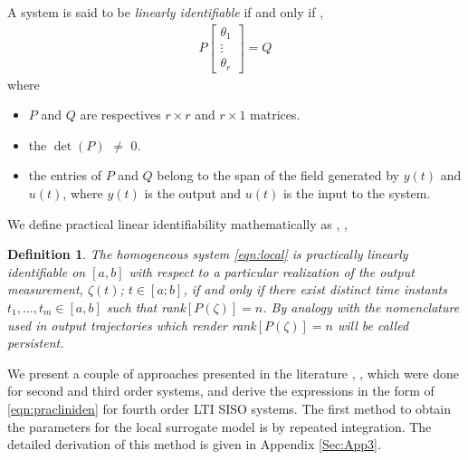 \documentclass[letterpaper%
, twoside%
, 12pt%
,memoire%
, english%
,creativecommons,hyperref%
]{thETS}
\theoremstyle{newThmStyle}
\newtheorem{definitionNewStyle}{Definition}
\begin{document}
\par A system is said to be \textit{linearly identifiable} if and only if \citep{fliess2003algebraic}, 
\begin{equation}\label{eqn:pracliniden}
\begin{split}
P\begin{bmatrix} \theta_1 \\ \vdots \\ \theta_r \end{bmatrix} = Q
\end{split}
\end{equation}
where
\begin{itemize}
\item $P$ and $Q$ are respectives $r \times r$ and $r \times 1$ matrices.
\item the $\det(P)$ $\neq$ $0$. 
\item the entries of $P$ and $Q$ belong to the span of the field generated by $y(t)$ and $u(t)$, where $y(t)$ is the output and $u(t)$ is the input to the system.
\end{itemize}
We define practical linear identifiability mathematically as \citep{pandey2018variational}, \citep{fliess2003algebraic}, 
\begin{definitionNewStyle}
The homogeneous system \eqref{eqn:local} is practically linearly identifiable on $[a, b]$ with respect to a particular realization of the output measurement, $\zeta(t)$; $t \in [a; b]$, if and only if there exist distinct time instants $t_1,..., t_m \in [a, b]$ such that rank$[P(\zeta)] = n$. By analogy with the nomenclature used in \citep{fliess2003algebraic} output trajectories which render rank$[P(\zeta)] = n$ will be called persistent.
\end{definitionNewStyle}
We present a couple of approaches presented in the literature \citep{fliess2003algebraic}, \citep{ghoshal2017using}, which were done for second and third order systems, and derive the expressions in the form of \eqref{eqn:pracliniden} for fourth order LTI SISO systems. The first method to obtain the parameters for the local surrogate model is by repeated integration. The detailed derivation of this method is given in Appendix \ref{Sec:App3}.
\end{document}
